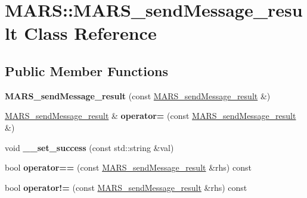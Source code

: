 \hypertarget{classMARS_1_1MARS__sendMessage__result}{}\section{M\+A\+RS\+:\+:M\+A\+R\+S\+\_\+send\+Message\+\_\+result Class Reference}
\label{classMARS_1_1MARS__sendMessage__result}
\subsection*{Public Member Functions}
\begin{DoxyCompactItemize}
\item 
\mbox{\label{classMARS_1_1MARS__sendMessage__result_aa891b355f7e24772f7089fc22aa7b2e9}} 
{\bfseries M\+A\+R\+S\+\_\+send\+Message\+\_\+result} (const \hyperlink{classMARS_1_1MARS__sendMessage__result}{M\+A\+R\+S\+\_\+send\+Message\+\_\+result} \&)
\item 
\mbox{\label{classMARS_1_1MARS__sendMessage__result_aea32e2704836fa3dd6446cae977edc3c}} 
\hyperlink{classMARS_1_1MARS__sendMessage__result}{M\+A\+R\+S\+\_\+send\+Message\+\_\+result} \& {\bfseries operator=} (const \hyperlink{classMARS_1_1MARS__sendMessage__result}{M\+A\+R\+S\+\_\+send\+Message\+\_\+result} \&)
\item 
\mbox{\label{classMARS_1_1MARS__sendMessage__result_ad4169aed69fd460aa528983a53d8ced7}} 
void {\bfseries \+\_\+\+\_\+set\+\_\+success} (const std\+::string \&val)
\item 
\mbox{\label{classMARS_1_1MARS__sendMessage__result_a007d1ba036a0ca935eca2dd5441f5534}} 
bool {\bfseries operator==} (const \hyperlink{classMARS_1_1MARS__sendMessage__result}{M\+A\+R\+S\+\_\+send\+Message\+\_\+result} \&rhs) const
\item 
\mbox{\label{classMARS_1_1MARS__sendMessage__result_afdf5b32ae4a05f76fdfc1fd2e8d7cefc}} 
bool {\bfseries operator!=} (const \hyperlink{classMARS_1_1MARS__sendMessage__result}{M\+A\+R\+S\+\_\+send\+Message\+\_\+result} \&rhs) const
\item 

\end{DoxyCompactItemize}
